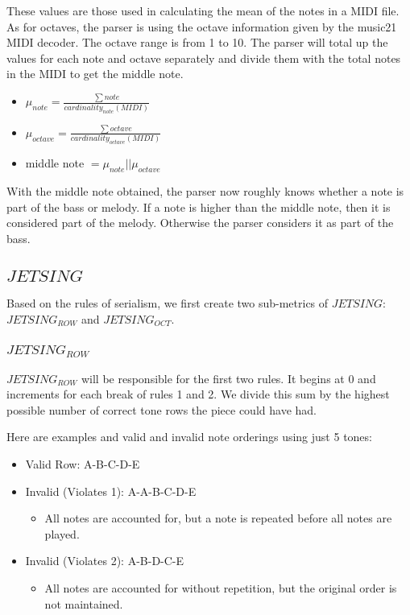 \documentclass[11pt]{article}
\begin{document}
These values are those used in calculating the mean of the notes in a MIDI file.
As for octaves, the parser is using the octave information given by the music21 MIDI decoder. The octave range is from 1 to 10.
The parser will total up the values for each note and octave separately and divide them with the total notes in the MIDI to get the middle note.

\begin{itemize}
    \item $ \mu_{note} = \frac{\sum note}{cardinality_{note}(MIDI)} $ 
    \item $ \mu_{octave} = \frac{\sum octave}{cardinality_{octave}(MIDI)} $
    \item middle note $= \mu_{note} || \mu_{octave} $
\end{itemize}

With the middle note obtained, the parser now roughly knows whether a note is part of the bass or melody.
If a note is higher than the middle note, then it is considered part of the melody.
Otherwise the parser considers it as part of the bass.

\subsection{$JETSING$}
Based on the rules of serialism, we first create two sub-metrics of $JETSING$: $JETSING_{ROW}$ and $JETSING_{OCT}$.

\subsubsection{$JETSING_{ROW}$}
$JETSING_{ROW}$ will be responsible for the first two rules.
It begins at 0 and increments for each break of rules 1 and 2. 
We divide this sum by the highest possible number of correct tone rows the piece could have had.

Here are examples and valid and invalid note orderings using just 5 tones:
\begin{itemize}
    \item Valid Row: A-B-C-D-E 
    \item Invalid (Violates 1): A-A-B-C-D-E
    \begin{itemize}
        \item All notes are accounted for, but a note is repeated before all notes are played.
    \end{itemize}
    \item Invalid (Violates 2): A-B-D-C-E
    \begin{itemize}
        \item All notes are accounted for without repetition, but the original order is not maintained.
    \end{itemize}
\end{itemize}
\end{document}
